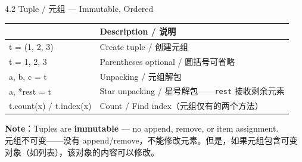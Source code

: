 \documentclass[11pt,a4paper]{report}
\let\oldtexttt\texttt
\renewcommand{\texttt}[1]{\textcolor{mainblue}{\oldtexttt{#1}}}
\begin{document}
\begin{cmdsection}{4.2  Tuple / 元组 — Immutable, Ordered}
\normalsize\renewcommand{\arraystretch}{1.4}
\centering
\begin{tabularx}{\textwidth}{@{}>{\ttfamily}l>{\raggedright\arraybackslash}X@{}}
\toprule
\multicolumn{1}{@{}l}{\textbf{Syntax}} & \textbf{Description / 说明} \\ \midrule
t = (1, 2, 3)               & Create tuple / 创建元组 \\
t = 1, 2, 3                 & Parentheses optional / 圆括号可省略 \\
a, b, c = t                 & Unpacking / 元组解包 \\
a, *rest = t                & Star unpacking / 星号解包——\texttt{rest} 接收剩余元素 \\
t.count(x) / t.index(x)     & Count / Find index（元组仅有的两个方法） \\
\bottomrule
\end{tabularx}
\medskip
\textbf{Note}：Tuples are \textbf{immutable} — no append, remove, or item assignment.\\
元组不可变——没有 append/remove，不能修改元素。但是，如果元组包含可变对象（如列表），该对象的内容可以修改。
\end{cmdsection}
\end{document}
